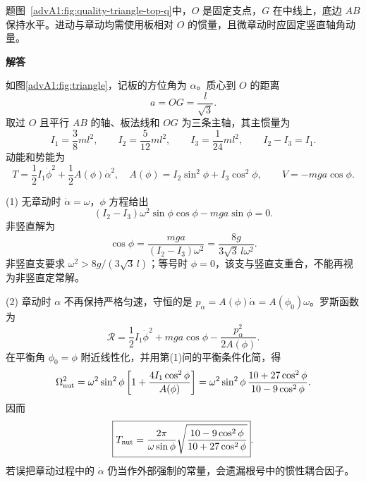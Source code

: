\begin{advsolution}题图~\ref{advA1:fig:quality-triangle-top-q}中，$O$ 是固定支点，$G$ 在中线上，底边 $AB$ 保持水平。进动与章动均需使用板相对 $O$ 的惯量，且微章动时应固定竖直轴角动量。

\noindent\begin{minipage}{\linewidth}{\bfseries\color{DeepBlue}解答}\par
\begin{center}\begin{minipage}{\linewidth}\centering
{}
\label{advA1:fig:triangle}
\end{minipage}\end{center}\end{minipage}

如图\ref{advA1:fig:triangle}，记板的方位角为 $\alpha$。质心到 $O$ 的距离
\[
 a=OG=\frac{l}{\sqrt3}.
\]
取过 $O$ 且平行 $AB$ 的轴、板法线和 $OG$ 为三条主轴，其主惯量为
\[
 I_1=\frac{3}{8}ml^2,
 \qquad I_2=\frac{5}{12}ml^2,
 \qquad I_3=\frac1{24}ml^2,
 \qquad I_2-I_3=I_1.
\]
动能和势能为
\[
 T=\frac12I_1\dot\phi^2+
 \frac12A(\phi)\dot\alpha^2,
 \quad A(\phi)=I_2\sin^2\phi+I_3\cos^2\phi,
 \qquad V=-mga\cos\phi.
\]

(1) 无章动时 $\dot\alpha=\omega$，$\phi$ 方程给出
\[
 (I_2-I_3)\omega^2\sin\phi\cos\phi-mga\sin\phi=0.
\]
非竖直解为
\[
 \boxed{\cos\phi=\frac{mga}{(I_2-I_3)\omega^2}
 =\frac{8g}{3\sqrt3\,l\omega^2}}.
\]
非竖直支要求 $\omega^2>8g/(3\sqrt3\,l)$；等号时 $\phi=0$，该支与竖直支重合，不能再视为非竖直定常解。

(2) 章动时 $\alpha$ 不再保持严格匀速，守恒的是
$p_\alpha=A(\phi)\dot\alpha=A(\phi_0)\omega$。罗斯函数为
\[
 \mathcal R=\frac12I_1\dot\phi^2+mga\cos\phi
 -\frac{p_\alpha^2}{2A(\phi)}.
\]
在平衡角 $\phi_0=\phi$ 附近线性化，并用第(1)问的平衡条件化简，得
\[
 \Omega_{\rm nut}^2
 =\omega^2\sin^2\phi
 \left[1+\frac{4I_1\cos^2\phi}{A(\phi)}\right]
 =\omega^2\sin^2\phi\,
 \frac{10+27\cos^2\phi}{10-9\cos^2\phi}.
\]
因而
\[
 \boxed{T_{\rm nut}=\frac{2\pi}{\omega\sin\phi}
 \sqrt{\frac{10-9\cos^2\phi}{10+27\cos^2\phi}}}.
\]
若误把章动过程中的 $\dot\alpha$ 仍当作外部强制的常量，会遗漏根号中的惯性耦合因子。
\end{advsolution}
